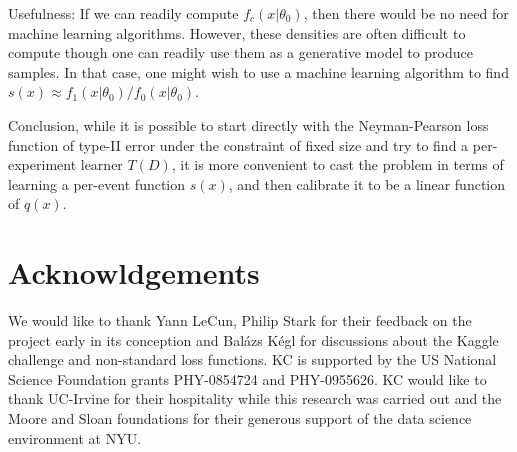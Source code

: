 \documentclass[11pt, oneside]{article}   	%
\begin{document}
Usefulness:
If we can readily compute $f_c(x|\theta_0)$, then there would be no need for machine learning algorithms. However,  these densities are often difficult to compute though one can readily use them as a generative model to produce samples. In that case, one might wish to use a machine learning algorithm to find $s(x) \approx f_1(x|\theta_0) / f_0(x|\theta_0)$. 

Conclusion, while it is possible to start directly with the Neyman-Pearson loss function of type-II error under the constraint of fixed size and try to find a per-experiment learner $T(D)$, it is more convenient to cast the problem in terms of learning a per-event function $s(x)$, and then calibrate it to be a linear function of $q(x)$.



\section*{Acknowldgements}
We would like to thank Yann LeCun, Philip Stark for their feedback on the
project early in its conception and Bal\'azs K\'egl for discussions about the Kaggle challenge and 
non-standard loss functions.
KC is supported by the US National Science Foundation grants PHY-0854724 and PHY-0955626. 
KC would like to thank UC-Irvine for their hospitality while this research was carried out and the 
Moore and Sloan foundations for their generous support of the data science environment at NYU.
\end{document}
